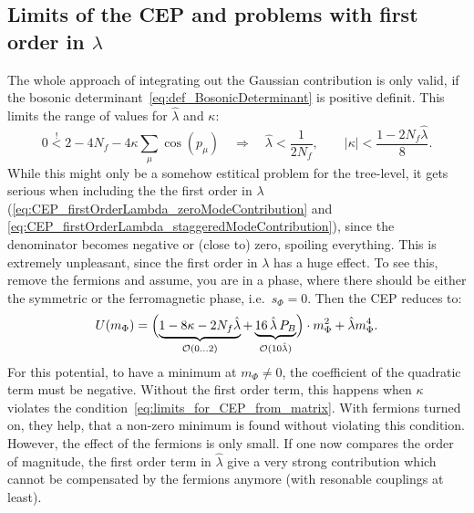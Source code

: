 \subsection*{Limits of the CEP and problems with first order in $\lambda$}
The whole approach of integrating out the Gaussian contribution is only valid, if the bosonic determinant~\eqref{eq:def_BosonicDeterminant}
is positive definit. This limits the range of values for $\hat\lambda$ and $\kappa$:
\begin{equation}\label{eq:limits_for_CEP_from_matrix}
 0 \stackrel{!}{<} 2 - 4 N_f - 4 \kappa \sum\limits_{\mu} \cos(p_{\mu}) \quad \Rightarrow \quad
 \hat\lambda < \frac{1}{2 N_f} ,\qquad
 |\kappa| < \frac{1 - 2 N_f \hat \lambda}{8}.
\end{equation}
While this might only be a somehow estitical problem for the tree-level, it gets serious when including the the first order in 
$\lambda$ (\eqref{eq:CEP_firstOrderLambda_zeroModeContribution} and \eqref{eq:CEP_firstOrderLambda_staggeredModeContribution}), since the denominator
becomes negative or (close to) zero, spoiling everything.
This is extremely unpleasant, since the first order in $\lambda$ has a huge effect. To see this, remove the fermions and assume, you are in a phase, where 
there should be either the symmetric or the ferromagnetic phase, i.e.\ $s_{\Phi}=0$. Then the CEP reduces to:
\begin{equation}\label{eq:simple_CEP_reduction}
 U(m_{\Phi}) = \Bigl( \underbrace{1 - 8\kappa - 2 N_f \hat \lambda}_{\mathcal{O}(0\dots 2)} 
             + \underbrace{ 16\, \hat\lambda\, P_B}_{\mathcal{O}(10\hat\lambda)} \Bigr)\cdot m_{\Phi}^2 + \hat \lambda m_{\Phi}^4.
\end{equation}
For this potential, to have a minimum at $m_{\Phi}\neq 0$, the coefficient of the quadratic term must be negative. Without the first order term, this happens 
when $\kappa$ violates the condition~\eqref{eq:limits_for_CEP_from_matrix}. With fermions turned on, they help, that a non-zero minimum 
is found without violating this condition. However, the effect of the fermions is only small. If one now compares the order of magnitude, the first order term in 
$\hat\lambda$ give a very strong contribution which cannot be compensated by the fermions anymore (with resonable couplings at least).


